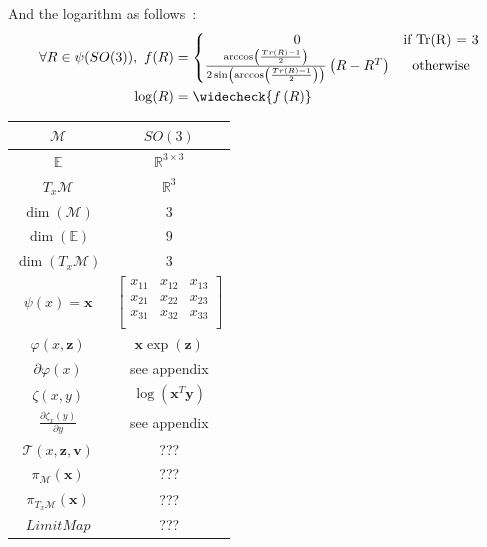 And the logarithm as follows~\cite{merlhiot:thesis:2009}:
\begin{align}
\begin{split}
  \forall R\in\psi(SO(3)),\ f(R) &=
  \left\{ \begin{matrix}
  0 & \text{if Tr(R) = 3} \\
  \frac{\arccos\left(\frac{Tr(R)-1}{2}\right)}{2\sin\left(\arccos\left(\frac{Tr(R)-1}{2}\right)\right)}\left(R-R^T\right) & \text{otherwise} \\
  \end{matrix} \right.\\
  \log(R) &= \widecheck{f\left(R\right)}
\end{split}
\end{align}

\begin{table} [H]
\centering
\begin{tabular}{cc}
  \toprule
  $\mathcal{M}$ & $SO(3)$ \\
  \midrule
  $\mathbb{E}$ & $\mathbb{R}^{3\times 3}$ \\
  \midrule
  $T_x\mathcal{M}$ & $\mathbb{R}^3$ \\
  \midrule
  $\dim(\mathcal{M})$ & $3$ \\
  \midrule
  $\dim(\mathbb{E})$ & $9$ \\
  \midrule
  $\dim(T_x\mathcal{M})$ & $3$ \\
  \midrule
  $\psi(x) = \mathbf{x}$ & $ \begin{bmatrix}
    x_{11} & x_{12} & x_{13} \\
    x_{21} & x_{22} & x_{23} \\
    x_{31} & x_{32} & x_{33} \\
  \end{bmatrix} $ \\
  \midrule
  $\varphi(x,\mathbf{z})$ & $\mathbf{x}\exp(\mathbf{z})$ \\
  \midrule
  $\partial \varphi(x)$ & see appendix \\
  \midrule
  $\zeta(x,y)$ & $\log(\mathbf{x}^T\mathbf{y})$ \\
  \midrule
  $\frac{\partial \zeta_x(y)}{\partial y}$ & see appendix \\
  \midrule
  $\mathcal{T}(x,\mathbf{z}, \mathbf{v})$ & ??? \\
  \midrule
  $\pi_\mathcal{M}(\mathbf{x})$ & ??? \\
  \midrule
  $\pi_{T_x\mathcal{M}}(\mathbf{x})$ & ??? \\
  \midrule
  $Limit Map$ & ??? \\
  \bottomrule
\end{tabular}
\end{table}

